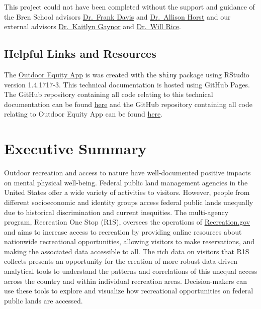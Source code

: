 \documentclass[
]{book}
\begin{document}
This project could not have been completed without the support and guidance of the Bren School advisors \href{https://bren.ucsb.edu/people/frank-davis}{Dr.~Frank Davis} and \href{https://bren.ucsb.edu/people/allison-horst}{Dr.~Allison Horst} and our external advisors \href{https://gaynorlab.weebly.com/people.html}{Dr.~Kaitlyn Gaynor} and \href{https://www.willrice.us/}{Dr.~Will Rice}.

\hypertarget{helpful-links-and-resources}{%
\section{Helpful Links and Resources}\label{helpful-links-and-resources}}

The \href{https://shinyapps.bren.ucsb.edu/oe_app/}{Outdoor Equity App} is was created with the \texttt{shiny} package \citep{R-shiny} using RStudio version 1.4.1717-3. This technical documentation is hosted using GitHub Pages. The GitHub repository containing all code relating to this technical documentation can be found \href{https://github.com/cboyajian/outdoor-equity-tech-doc}{here} and the GitHub repository containing all code relating to Outdoor Equity App can be found \href{https://github.com/outdoor-equity/outdoor-equity}{here}.

\hypertarget{executive-summary}{%
\chapter{Executive Summary}\label{executive-summary}}

Outdoor recreation and access to nature have well-documented positive impacts on mental physical well-being. Federal public land management agencies in the United States offer a wide variety of activities to visitors. However, people from different socioeconomic and identity groups access federal public lands unequally due to historical discrimination and current inequities. The multi-agency program, Recreation One Stop (R1S), oversees the operations of \href{https://www.recreation.gov/}{Recreation.gov} and aims to increase access to recreation by providing online resources about nationwide recreational opportunities, allowing visitors to make reservations, and making the associated data accessible to all. The rich data on visitors that R1S collects presents an opportunity for the creation of more robust data-driven analytical tools to understand the patterns and correlations of this unequal access across the country and within individual recreation areas. Decision-makers can use these tools to explore and visualize how recreational opportunities on federal public lands are accessed.
\end{document}
